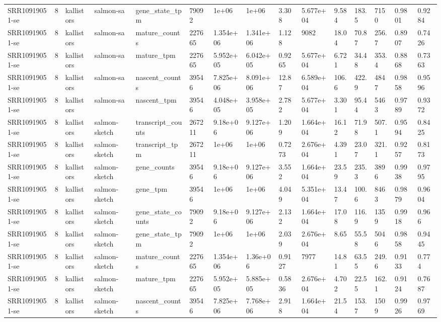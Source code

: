 \begin{tabular}{lllllllllllllll}
SRR10919051-se & 8 & kallistors & salmon-sa & gene\_state\_tpm & 79092 & 1e+06 & 1e+06 & 3.308 & 5.677e+04 & 9.584 & 183.5 & 7150 & 0.9801 & 0.9284 \\
SRR10919051-se & 8 & kallistors & salmon-sa & mature\_counts & 227665 & 1.354e+06 & 1.341e+06 & 1.128 & 9082 & 18.04 & 70.87 & 256.7 & 0.8907 & 0.7426 \\
SRR10919051-se & 8 & kallistors & salmon-sa & mature\_tpm & 227665 & 5.952e+05 & 6.042e+05 & 0.9265 & 5.677e+04 & 6.721 & 34.48 & 353.4 & 0.8868 & 0.7363 \\
SRR10919051-se & 8 & kallistors & salmon-sa & nascent\_counts & 39546 & 7.825e+06 & 8.091e+06 & 12.87 & 6.589e+04 & 106.6 & 422.9 & 4847 & 0.9858 & 0.9596 \\
SRR10919051-se & 8 & kallistors & salmon-sa & nascent\_tpm & 39546 & 4.048e+05 & 3.958e+05 & 2.782 & 5.677e+04 & 3.301 & 95.44 & 5463 & 0.9789 & 0.9372 \\
SRR10919051-se & 8 & kallistors & salmon-sketch & transcript\_counts & 267211 & 9.18e+06 & 9.127e+06 & 1.209 & 1.664e+04 & 16.12 & 71.98 & 507.1 & 0.9594 & 0.8425 \\
SRR10919051-se & 8 & kallistors & salmon-sketch & transcript\_tpm & 267211 & 1e+06 & 1e+06 & 0.7273 & 2.676e+04 & 4.391 & 23.07 & 321.1 & 0.9257 & 0.8173 \\
SRR10919051-se & 8 & kallistors & salmon-sketch & gene\_counts & 39546 & 9.18e+06 & 9.127e+06 & 3.552 & 1.664e+04 & 23.59 & 235.3 & 3896 & 0.9938 & 0.9795 \\
SRR10919051-se & 8 & kallistors & salmon-sketch & gene\_tpm & 39546 & 1e+06 & 1e+06 & 4.049 & 5.351e+04 & 13.47 & 100.6 & 8463 & 0.9879 & 0.9604 \\
SRR10919051-se & 8 & kallistors & salmon-sketch & gene\_state\_counts & 79092 & 9.18e+06 & 9.127e+06 & 2.132 & 1.664e+04 & 17.08 & 116.9 & 1359 & 0.9918 & 0.966 \\
SRR10919051-se & 8 & kallistors & salmon-sketch & gene\_state\_tpm & 79092 & 1e+06 & 1e+06 & 2.039 & 2.676e+04 & 8.65 & 55.58 & 5046 & 0.9858 & 0.9445 \\
SRR10919051-se & 8 & kallistors & salmon-sketch & mature\_counts & 227665 & 1.354e+06 & 1.36e+06 & 0.9127 & 7977 & 14.81 & 63.55 & 249.6 & 0.9133 & 0.774 \\
SRR10919051-se & 8 & kallistors & salmon-sketch & mature\_tpm & 227665 & 5.952e+05 & 5.885e+05 & 0.5836 & 2.676e+04 & 4.702 & 22.55 & 162.1 & 0.9124 & 0.7687 \\
SRR10919051-se & 8 & kallistors & salmon-sketch & nascent\_counts & 39546 & 7.825e+06 & 7.768e+06 & 2.918 & 1.664e+04 & 21.54 & 153.7 & 1509 & 0.9926 & 0.9769 \\

\end{tabular}
